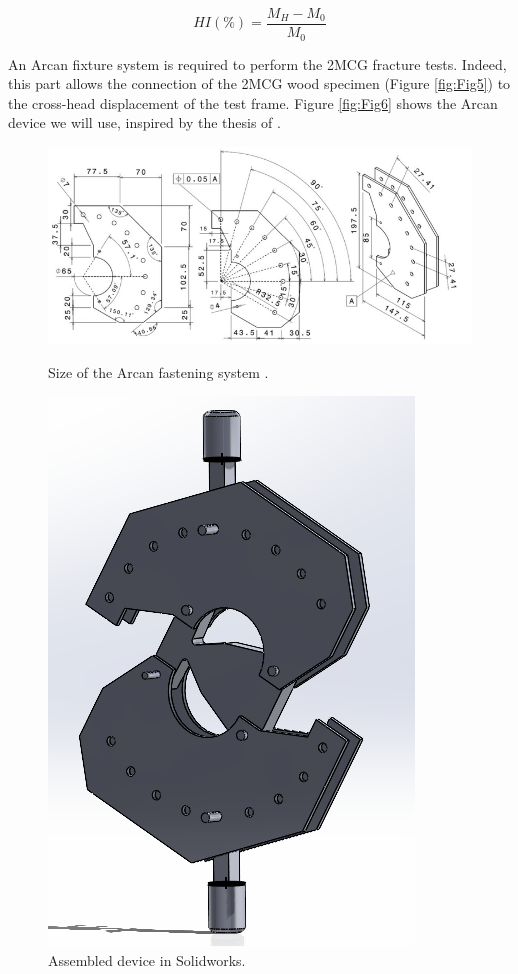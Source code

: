 \documentclass[3p,times,procedia]{elsarticle}
\begin{document}
\begin{equation}
	HI(\%) = \frac{M_{H}-M_{0}}{M_{0}}
	\label{eq:HI}
\end{equation}

An Arcan fixture system is required to perform the  2MCG fracture tests. Indeed, this part allows the connection of the 2MCG wood specimen (Figure \ref{fig:Fig5}) to the cross-head displacement of the test frame. Figure \ref{fig:Fig6} shows the Arcan device we will use, inspired by the thesis of \citep{Odounga2018phd}.

\begin{figure}[htp]
	\begin{minipage}[c]{.46\linewidth}
		\centering
		\includegraphics[scale=0.4]{Figures/fig24}
		\caption{Size of the Arcan fastening system \citep{Odounga2018phd}.}
		\label{fig:Fig6}
	\end{minipage}
	\hfill%
	\begin{minipage}[c]{.46\linewidth}
		\centering
		\includegraphics[scale=0.4]{Figures/fig26}
		\caption{Assembled device in Solidworks.}
		\label{fig:Fig8}
	\end{minipage}
\end{figure}
\end{document}
